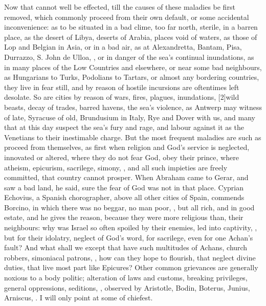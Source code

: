 {Now that cannot well be effected, till the causes of these maladies be
first removed, which commonly proceed from their own default, or some
accidental inconvenience: as to be situated in a bad clime, too far
north, sterile, in a barren place, as the desert of Libya, deserts of
Arabia, places void of waters, as those of Lop and Belgian in Asia, or
in a bad air, as at Alexandretta, Bantam, Pisa, Durrazzo, S. John de
Ulloa, \etc{}, or in danger of the sea's continual inundations, as in many
places of the Low Countries and elsewhere, or near some bad neighbours,
as Hungarians to Turks, Podolians to Tartars, or almost any bordering
countries, they live in fear still, and by reason of hostile incursions
are oftentimes left desolate. So are cities by reason of wars,
fires, plagues, inundations, [2\baselineskip]wild beasts, decay of trades, barred
havens, the sea's violence, as Antwerp may witness of late, Syracuse of
old, Brundusium in Italy, Rye and Dover with us, and many that at this
day suspect the sea's fury and rage, and labour against it as the
Venetians to their inestimable charge. But the most frequent maladies
are such as proceed from themselves, as first when religion and God's
service is neglected, innovated or altered, where they do not fear God,
obey their prince, where atheism, epicurism, sacrilege, simony, \etc{},
and all such impieties are freely committed, that country cannot
prosper. When Abraham came to Gerar, and saw a bad land, he said, sure
the fear of God was not in that place.  Cyprian Echovius, a
Spanish chorographer, above all other cities of Spain, commends
Borcino, in which there was no beggar, no man poor, \etc{}, but all rich,
and in good estate, and he gives the reason, because they were more
religious than, their neighbours: why was Israel so often spoiled by
their enemies, led into captivity, \etc{}, but for their idolatry, neglect
of God's word, for sacrilege, even for one Achan's fault? And what
shall we except that have such multitudes of Achans, church robbers,
simoniacal patrons, \etc{}, how can they hope to flourish, that neglect
divine duties, that live most part like Epicures?
Other common grievances are generally noxious to a body politic;
alteration of laws and customs, breaking privileges, general
oppressions, seditions, \etc{}, observed by Aristotle, Bodin,
Boterus, Junius, Arniscus, \etc{}. I will only point at some of chiefest.

}
